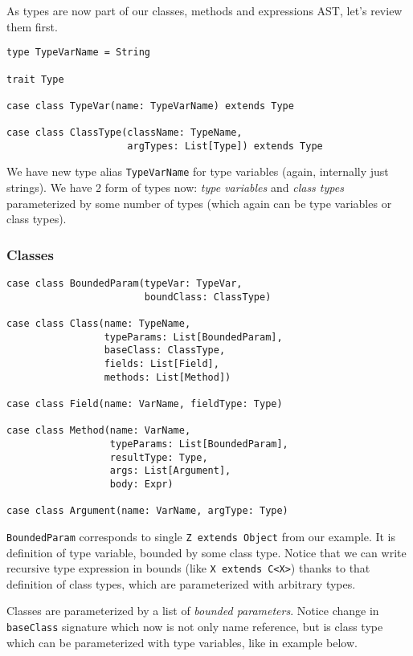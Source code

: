 \documentclass{article}[12pt]
\begin{document}
As types are now part of our classes, methods and expressions
AST, let's review them first.

\begin{verbatim}
type TypeVarName = String

trait Type

case class TypeVar(name: TypeVarName) extends Type

case class ClassType(className: TypeName,
                     argTypes: List[Type]) extends Type
\end{verbatim}

We have new type alias \texttt{TypeVarName} for type variables
(again, internally just strings). We have 2 form of types now:
\emph{type variables} and \emph{class types} parameterized by
some number of types (which again can be type variables or
class types).

\subsubsection{Classes}

\begin{verbatim}
case class BoundedParam(typeVar: TypeVar,
                        boundClass: ClassType)

case class Class(name: TypeName,
                 typeParams: List[BoundedParam],
                 baseClass: ClassType,
                 fields: List[Field],
                 methods: List[Method])

case class Field(name: VarName, fieldType: Type)

case class Method(name: VarName,
                  typeParams: List[BoundedParam],
                  resultType: Type,
                  args: List[Argument],
                  body: Expr)
                  
case class Argument(name: VarName, argType: Type)
\end{verbatim}

\texttt{BoundedParam} corresponds to single
\texttt{Z extends Object} from our example. It is definition
of type variable, bounded by some class type. Notice that we
can write recursive type expression in bounds
(like \texttt{X extends C<X>}) thanks to that definition of class
types, which are parameterized with arbitrary types.

Classes are parameterized by a list of \emph{bounded parameters}.
Notice change in \texttt{baseClass} signature which now is not
only name reference, but is class type which can be parameterized
with type variables, like in example below.
\end{document}
